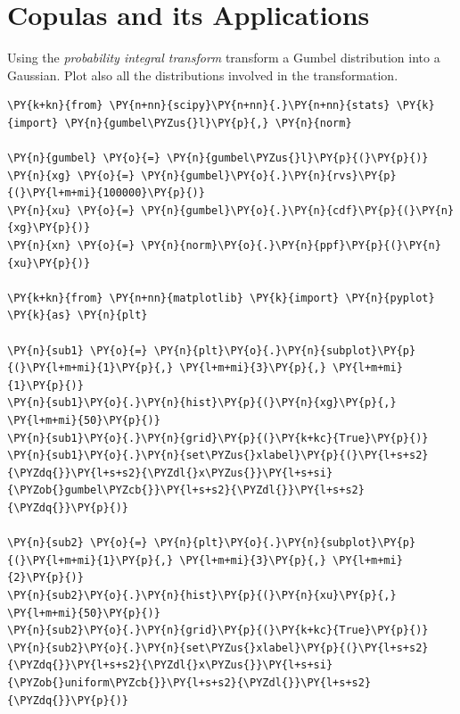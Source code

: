 \chapter{Copulas and its Applications}\label{introduction-to-python---lesson-11}

\begin{Exercise}[title={(Distribution Transformation)}]
	Using the \emph{probability integral transform} transform a Gumbel distribution into a Gaussian. Plot also all the distributions involved in the transformation.
\end{Exercise}

\begin{Answer}
\begin{tcolorbox}[size=fbox, boxrule=1pt, colback=cellbackground, colframe=cellborder]
\begin{Verbatim}[commandchars=\\\{\}]
\PY{k+kn}{from} \PY{n+nn}{scipy}\PY{n+nn}{.}\PY{n+nn}{stats} \PY{k}{import} \PY{n}{gumbel\PYZus{}l}\PY{p}{,} \PY{n}{norm}
	
\PY{n}{gumbel} \PY{o}{=} \PY{n}{gumbel\PYZus{}l}\PY{p}{(}\PY{p}{)}
\PY{n}{xg} \PY{o}{=} \PY{n}{gumbel}\PY{o}{.}\PY{n}{rvs}\PY{p}{(}\PY{l+m+mi}{100000}\PY{p}{)}
\PY{n}{xu} \PY{o}{=} \PY{n}{gumbel}\PY{o}{.}\PY{n}{cdf}\PY{p}{(}\PY{n}{xg}\PY{p}{)}
\PY{n}{xn} \PY{o}{=} \PY{n}{norm}\PY{o}{.}\PY{n}{ppf}\PY{p}{(}\PY{n}{xu}\PY{p}{)}

\PY{k+kn}{from} \PY{n+nn}{matplotlib} \PY{k}{import} \PY{n}{pyplot} \PY{k}{as} \PY{n}{plt}

\PY{n}{sub1} \PY{o}{=} \PY{n}{plt}\PY{o}{.}\PY{n}{subplot}\PY{p}{(}\PY{l+m+mi}{1}\PY{p}{,} \PY{l+m+mi}{3}\PY{p}{,} \PY{l+m+mi}{1}\PY{p}{)}
\PY{n}{sub1}\PY{o}{.}\PY{n}{hist}\PY{p}{(}\PY{n}{xg}\PY{p}{,} \PY{l+m+mi}{50}\PY{p}{)}
\PY{n}{sub1}\PY{o}{.}\PY{n}{grid}\PY{p}{(}\PY{k+kc}{True}\PY{p}{)}
\PY{n}{sub1}\PY{o}{.}\PY{n}{set\PYZus{}xlabel}\PY{p}{(}\PY{l+s+s2}{\PYZdq{}}\PY{l+s+s2}{\PYZdl{}x\PYZus{}}\PY{l+s+si}{\PYZob{}gumbel\PYZcb{}}\PY{l+s+s2}{\PYZdl{}}\PY{l+s+s2}{\PYZdq{}}\PY{p}{)}

\PY{n}{sub2} \PY{o}{=} \PY{n}{plt}\PY{o}{.}\PY{n}{subplot}\PY{p}{(}\PY{l+m+mi}{1}\PY{p}{,} \PY{l+m+mi}{3}\PY{p}{,} \PY{l+m+mi}{2}\PY{p}{)}
\PY{n}{sub2}\PY{o}{.}\PY{n}{hist}\PY{p}{(}\PY{n}{xu}\PY{p}{,} \PY{l+m+mi}{50}\PY{p}{)}
\PY{n}{sub2}\PY{o}{.}\PY{n}{grid}\PY{p}{(}\PY{k+kc}{True}\PY{p}{)}
\PY{n}{sub2}\PY{o}{.}\PY{n}{set\PYZus{}xlabel}\PY{p}{(}\PY{l+s+s2}{\PYZdq{}}\PY{l+s+s2}{\PYZdl{}x\PYZus{}}\PY{l+s+si}{\PYZob{}uniform\PYZcb{}}\PY{l+s+s2}{\PYZdl{}}\PY{l+s+s2}{\PYZdq{}}\PY{p}{)}


\end{Verbatim}
\end{tcolorbox}
\end{Answer}

